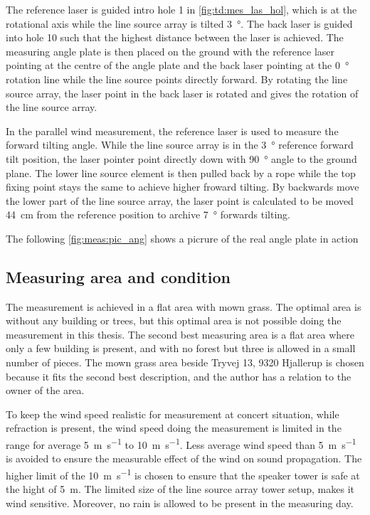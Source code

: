 The reference laser is guided intro hole 1 in \autoref{fig:td:mes_las_hol}, which is at the rotational axis while the line source array is tilted \SI{3}{\degree}. The back laser is guided into hole 10 such that the highest distance between the laser is achieved. The measuring angle plate is then placed on the ground with the reference laser pointing at the centre of the angle plate and the back laser pointing at the \SI{0}{\degree} rotation line while the line source points directly forward. By rotating the line source array, the laser point in the back laser is rotated and gives the rotation of the line source array.

In the parallel wind measurement, the reference laser is used to measure the forward tilting angle. While the line source array is in the \SI{3}{\degree} reference forward tilt position, the laser pointer point directly down with \SI{90}{\degree} angle to the ground plane. The lower line source element is then pulled back by a rope while the top fixing point stays the same to achieve higher froward tilting. By backwards move the lower part of the line source array, the laser point is calculated to be moved \SI{44}{\centi\meter} from the reference position to archive \SI{7}{\degree} forwards tilting.

The following \autoref{fig:meas:pic_ang} shows a picrure of the real angle plate in action 


\subsection{Measuring area and condition}
The measurement is achieved in a flat area with mown grass. The optimal area is without any building or trees, but this optimal area is not possible doing the measurement in this thesis. The second best measuring area is a flat area where only a few building is present, and with no forest but three is allowed in a small number of pieces. The mown grass area beside Tryvej 13, 9320 Hjallerup is chosen because it fits the second best description, and the author has a relation to the owner of the area.


To keep the wind speed realistic for measurement at concert situation, while refraction is present, the wind speed doing the measurement is limited in the range for average \SI{5}{\meter\per\second} to \SI{10}{\meter\per\second}. Less average wind speed than \SI{5}{\meter\per\second} is avoided to ensure the measurable effect of the wind on sound propagation. The higher limit of the \SI{10}{\meter\per\second} is chosen to ensure that the speaker tower is safe at the hight of \SI{5}{\meter}. The limited size of the line source array tower setup, makes it wind sensitive. Moreover, no rain is allowed to be present in the measuring day.

